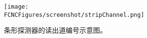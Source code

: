 \begin{figure}[H]
\centering
\texttt{[image: \\FCNCFigures/screenshot/stripChannel.png]}
\caption{条形探测器的读出道编号示意图。}
\label{fig:stripChannel}
\end{figure}